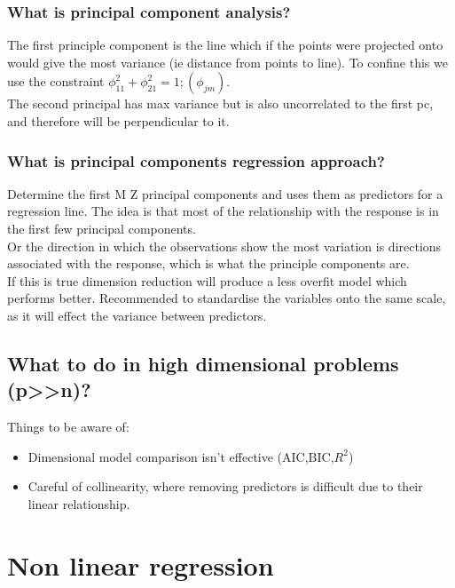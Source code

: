 \documentclass[11pt]{scrartcl} %
\begin{document}
\subsubsection{What is principal component analysis?}

The first principle component is the line which if the points were projected onto would give the
most variance (ie distance from points to line). To confine this we use the constraint 
\(\phi_{11}^2 + \phi_{21}^2 =1; (\phi_{jm})\).\\

The second principal has max variance but is also uncorrelated to the first pc, and therefore will
be perpendicular to it.

\subsubsection{What is principal components regression approach?}

Determine the first M Z principal components and uses them as predictors for a regression line.
The idea is that most of the relationship with the response is in the first few principal components.\\

Or the direction in which the observations show the most variation is directions associated with the response,
which is what the principle components are.\\

If this is true dimension reduction will produce a less overfit model which performs better. Recommended
to standardise the variables onto the same scale, as it will effect the variance between predictors.

\subsection{What to do in high dimensional problems (p>>n)?}

Things to be aware of:

\begin{itemize}
	\item Dimensional model comparison isn't effective (AIC,BIC,\(R^2\))
	\item Careful of collinearity, where removing predictors is difficult due to their linear relationship.
\end{itemize}

\section{Non linear regression}
\end{document}
